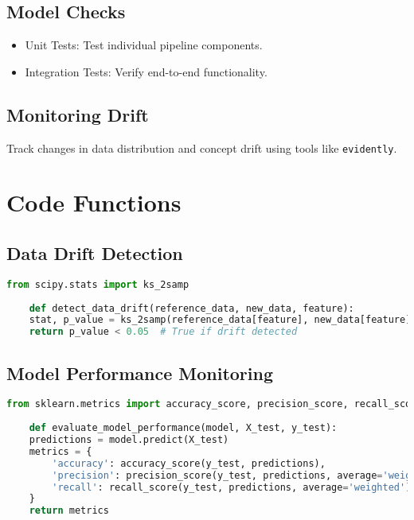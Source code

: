 \subsection{Model Checks}
\begin{itemize}
    \item Unit Tests: Test individual pipeline components.
    \item Integration Tests: Verify end-to-end functionality.
\end{itemize}

\subsection{Monitoring Drift}
Track changes in data distribution and concept drift using tools like \texttt{evidently}.

\section{Code Functions}
\subsection{Data Drift Detection}
\begin{lstlisting}[language=Python, caption={Detecting Data Drift Using the Kolmogorov-Smirnov Test}, label={code:data-drift-detection}, style=pythonstyle]
	from scipy.stats import ks_2samp
	
	def detect_data_drift(reference_data, new_data, feature):
	stat, p_value = ks_2samp(reference_data[feature], new_data[feature])
	return p_value < 0.05  # True if drift detected
\end{lstlisting}


\subsection{Model Performance Monitoring}
\begin{lstlisting}[language=Python, caption={Evaluating Model Performance Using Common Metrics}, label={code:model-performance-evaluation}, style=pythonstyle]
	from sklearn.metrics import accuracy_score, precision_score, recall_score
	
	def evaluate_model_performance(model, X_test, y_test):
	predictions = model.predict(X_test)
	metrics = {
		'accuracy': accuracy_score(y_test, predictions),
		'precision': precision_score(y_test, predictions, average='weighted'),
		'recall': recall_score(y_test, predictions, average='weighted')
	}
	return metrics
\end{lstlisting}


